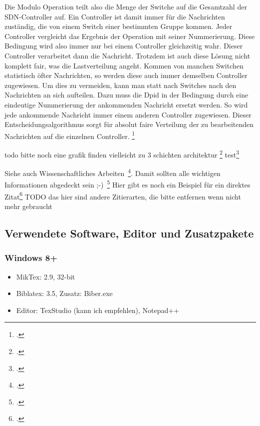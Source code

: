 Die Modulo Operation teilt also die Menge der Switche auf die Gesamtzahl der \ac{SDN}-Controller auf. Ein Controller ist damit immer für die Nachrichten zuständig, die von einem Switch einer bestimmten Gruppe kommen. 
Jeder Controller vergleicht das Ergebnis der Operation mit seiner Nummerierung. Diese Bedingung wird also immer nur bei einem Controller gleichzeitig wahr. Dieser Controller verarbeitet dann die Nachricht. 
Trotzdem ist auch diese Lösung nicht komplett fair, was die Lastverteilung angeht. Kommen von manchen Switchen statistisch öfter Nachrichten, so werden diese auch immer demselben Controller zugewiesen. Um dies zu vermeiden, 
kann man statt nach Switches nach den Nachrichten an sich aufteilen. Dazu muss die Dpid in der Bedingung durch eine eindeutige Nummerierung der ankommenden Nachricht ersetzt werden. 
So wird jede ankommende Nachricht immer einem anderen Controller zugewiesen. Dieser Entscheidungsalgorithmus sorgt für absolut faire Verteilung der zu bearbeitenden Nachrichten auf die einzelnen Controller.
\footcite[Vgl.][S. 140]{Decker2009}

todo bitte noch eine grafik finden vielleicht zu 3 schichten architektur
\footcite[Vgl.][S. 2]{Moura2017}
test\footcite[Vgl.][S. 2]{9751692}



Siehe auch Wissenschaftliches Arbeiten~\footcite[\vglf][S. 1]{Balzert.2008}. %
Damit sollten alle wichtigen Informationen abgedeckt sein ;-)~\footcite[\vglf][]{Balzert.2008} %
Hier gibt es noch ein Beispiel für ein direktes Zitat\footcite[][]{Balzert.2008} %
TODO das hier sind andere Zitierarten, die bitte entfernen wenn nicht mehr gebraucht






\subsection{Verwendete Software, Editor und Zusatzpakete}
\subsubsection{Windows 8+}
\begin{itemize}
\item MikTex: 2.9, 32-bit
\item Biblatex: 3.5, Zusatz: Biber.exe
\item Editor: TexStudio (kann ich empfehlen), Notepad++
\end{itemize}

